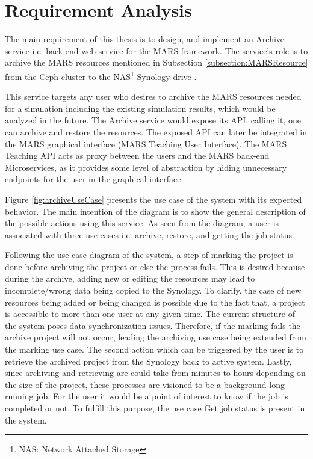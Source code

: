 \newpage
\chapter{Requirement Analysis}
\label{chap:ReqAnalysis}
 The main requirement of this thesis is to design, and implement an Archive service i.e. back-end web service for the MARS framework. The service's role is to
 archive the MARS resources mentioned in Subsection \ref{subsection:MARSResource} from the Ceph cluster \cite{Ceph} to the 
 NAS\footnote{NAS: Network Attached Storage} Synology drive \cite{Synology}.

 This service targets any user who desires to archive the MARS resources needed for a simulation including the existing simulation results, which would
 be analyzed in the future. The Archive service would expose its API, calling it, one can archive and restore the resources. The exposed
 API can later be integrated in the MARS graphical interface (MARS Teaching User Interface). The MARS Teaching API acts as proxy between the users 
 and the MARS back-end Microservices, as it provides some level of abstraction by hiding unnecessary endpoints for the user in the graphical interface.

 Figure \ref{fig:archiveUseCase} presents the use case of the system with its expected behavior. The main intention of the diagram is to show the
 general description of the possible actions using this service. As seen from the diagram, a user is associated with three use cases i.e. archive, restore,
 and getting the job status. 

 Following the use case diagram of the system, a step of marking the project is done before archiving the project or else the process fails. This is desired because 
 during the archive, adding new or editing the resources may lead to incomplete/wrong data being copied to the Synology. To clarify, the case of new resources being
 added or being changed is possible due to the fact that, a project is accessible to more than one user at any given time. The current structure of the system
 poses data synchronization issues. Therefore, if the marking fails the archive project will not occur, leading the archiving use case being extended from the marking
 use case. The second action which can be triggered by the user is to retrieve the archived project from the Synology back to active system. Lastly, since archiving 
 and retrieving are could take from minutes to hours depending on the size of the project, these processes are visioned to be a background long running job. For the user
 it would be a point of interest to know if the job is completed or not. To fulfill this purpose, the use case Get job status is present in the system.
 
